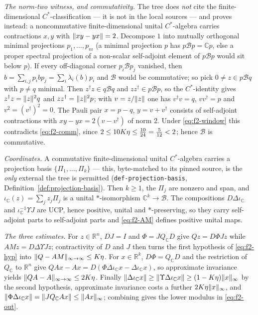 \emph{The norm-two witness, and commutativity.} The tree does \emph{not} cite the
finite-dimensional $C^{*}$-classification --- it is not in the local sources --- and proves
instead: a noncommutative finite-dimensional unital $C^{*}$-algebra carries contractions
$x,y$ with $\lVert xy-yx\rVert=2$. Decompose $1$ into mutually orthogonal minimal projections
$p_{1},\dots,p_{m}$ (a minimal projection $p$ has $p\mathcal Bp=\mathbb Cp$, else a proper
spectral projection of a non-scalar self-adjoint element of $p\mathcal Bp$ would sit below
$p$). If every off-diagonal corner $p_{i}\mathcal Bp_{j}$ vanished, then
$b=\sum_{i,j}p_{i}bp_{j}=\sum_{i}\lambda_{i}(b)p_{i}$ and $\mathcal B$ would be commutative;
so pick $0\ne z\in p\mathcal Bq$ with $p\ne q$ minimal. Then $z^{\dagger}z\in q\mathcal Bq$
and $zz^{\dagger}\in p\mathcal Bp$, so the $C^{*}$-identity gives
$z^{\dagger}z=\lVert z\rVert^{2}q$ and $zz^{\dagger}=\lVert z\rVert^{2}p$; with $v=z/\lVert z\rVert$ one has
$v^{\dagger}v=q$, $vv^{\dagger}=p$ and $v^{2}=(v^{\dagger})^{2}=0$. The Pauli pair
$x=p-q$, $y=v+v^{\dagger}$ consists of self-adjoint contractions with
$xy-yx=2(v-v^{\dagger})$ of norm $2$. Under \eqref{eq:f2-window} this contradicts
\eqref{eq:f2-comm}, since $2\le10K\eta\le\tfrac{10}{24}=\tfrac5{12}<2$; hence
$\mathcal B$ is commutative.

\emph{Coordinates.} A commutative finite-dimensional unital $C^{*}$-algebra carries a
projection basis $\{\Pi_{1},\dots,\Pi_{k}\}$ --- this, byte-matched to its pinned source, is
the \emph{only} external the tree is permitted (\texttt{def-projection-basis},
Definition~\ref{def:projection-basis}). Then $k\ge1$, the $\Pi_{j}$ are nonzero and span,
and $\iota_{\mathbb C}(z)=\sum_{j}z_{j}\Pi_{j}$ is a unital $*$-isomorphism
$\mathbb C^{k}\to\mathcal B$. The compositions $D\Delta\iota_{\mathbb C}$ and
$\iota_{\mathbb C}^{-1}\Upsilon J$ are UCP, hence positive, unital and $*$-preserving, so
they carry self-adjoint parts to self-adjoint parts and \eqref{eq:f2-AM} defines positive
unital maps.

\emph{The three estimates.} For $z\in\mathbb R^{n}$, $DJ=I$ and $\Phi=JQ_{\mathbb C}D$ give
$Qz=D\Phi Jz$ while $AMz=D\Delta\Upsilon Jz$; contractivity of $D$ and $J$ then turns the
first hypothesis of \eqref{eq:f2-hyp} into $\lVert Q-AM \rVert_{\infty\to\infty}\le K\eta$. For
$x\in\mathbb R^{k}$, $D\Phi=Q_{\mathbb C}D$ and the restriction of $Q_{\mathbb C}$ to
$\mathbb R^{n}$ give $QAx-Ax=D(\Phi\Delta\iota_{\mathbb C}x-\Delta\iota_{\mathbb C}x)$, so
approximate invariance yields $\lVert QA-A \rVert_{\infty\to\infty}\le2K\eta$. Finally
$\lVert \Delta\iota_{\mathbb C}x\rVert\ge\lVert \Upsilon\Delta\iota_{\mathbb C}x\rVert\ge(1-K\eta)\lVert x \rVert_{\infty}$
by the second hypothesis, approximate invariance costs a further $2K\eta\lVert x \rVert_{\infty}$, and
$\lVert \Phi\Delta\iota_{\mathbb C}x\rVert=\lVert JQ_{\mathbb C}Ax\rVert\le\lVert Ax \rVert_{\infty}$; combining gives the
lower modulus in \eqref{eq:f2-out}.

